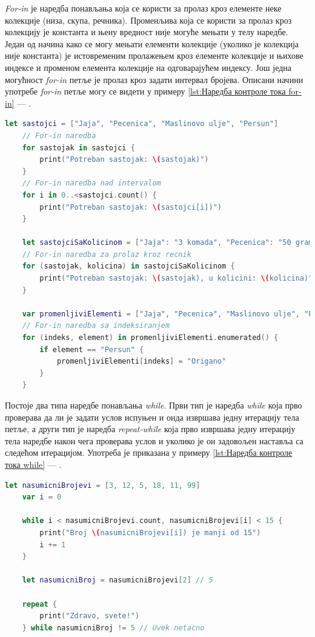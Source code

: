\documentclass[12pt,oneside]{memoir}
\begin{document}
\indent \textit{For-in} је наредба понављања која се користи за пролаз кроз елементе неке колекције (низа, скупа, речника). Променљива која се користи за пролаз кроз колекцију је константа и њену вредност није могуће мењати у телу наредбе. Један од начина како се могу мењати елементи колекције (уколико је колекција није константа) је истовременим пролажењем кроз елементе колекције и њихове индексе и променом елемента колекције на одговарајућем индексу. Још једна могућност \textit{for-in} петље је пролаз кроз задати интервал бројева. Описани начини употребе \textit{for-in} петље могу се видети у примеру \ref{lst:Наредба контроле тока for-in} --- .
\begin{lstlisting}[caption=\textit{{Наредба контроле тока for-in}}, label={lst:Наредба контроле тока for-in}, language=Swift, frame=single]
    let sastojci = ["Jaja", "Pecenica", "Maslinovo ulje", "Persun"]
    // For-in naredba
    for sastojak in sastojci {
        print("Potreban sastojak: \(sastojak)")
    }
    // For-in naredba nad intervalom
    for i in 0..<sastojci.count() {
        print("Potreban sastojak: \(sastojci[i])")
    }
    
    let sastojciSaKolicinom = ["Jaja": "3 komada", "Pecenica": "50 grama", "Maslinovo ulje": "Koliko je potrebno da pokrije tiganj", "Persun": "Prstohvat"]
    // For-in naredba za prolaz kroz recnik
    for (sastojak, kolicina) in sastojciSaKolicinom {
        print("Potreban sastojak: \(sastojak), u kolicini: \(kolicina)")
    }
    
    var promenljiviElementi = ["Jaja", "Pecenica", "Maslinovo ulje", "Persun"]
    // For-in naredba sa indeksiranjem
    for (indeks, element) in promenljiviElementi.enumerated() {
        if element == "Persun" {
            promenljiviElementi[indeks] = "Origano"
        }
    } 
\end{lstlisting}

\indent Постоје два типа наредбе понављања \textit{while}. Први тип је наредба \textit{while} која прво проверава да ли је задати услов испуњен и онда извршава једну итерацију тела петље, а други тип је наредба \textit{repeat-while} која прво извршава једну итерацију тела наредбе након чега проверава услов и уколико је он задовољен наставља са следећом итерацијом. Употреба је приказана у примеру \ref{lst:Наредба контроле тока while} --- . 

\begin{lstlisting}[caption=\textit{{Наредба контроле тока while}}, label={lst:Наредба контроле тока while}, language=Swift, frame=single]
    let nasumicniBrojevi = [3, 12, 5, 18, 11, 99]
    var i = 0
    
    while i < nasumicniBrojevi.count, nasumicniBrojevi[i] < 15 {
        print("Broj \(nasumicniBrojevi[i]) je manji od 15")
        i += 1
    }
    
    let nasumicniBroj = nasumicniBrojevi[2] // 5
    
    repeat {
        print("Zdravo, svete!")
    } while nasumicniBroj != 5 // Uvek netacno
\end{lstlisting}
\end{document}
